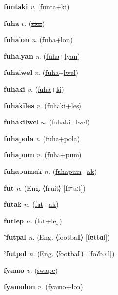 \textbf{\hypertarget{funtaki}{funtaki}} \textit{v.} (\hyperlink{funta}{funta}+\allowbreak \hyperlink{ki}{ki})


\textbf{\hypertarget{fuha}{fuha}} \textit{v.} (\hyperlink{sica}{\sout{sica}})


\textbf{\hypertarget{fuhalon}{fuhalon}} \textit{n.} (\hyperlink{fuha}{fuha}+\allowbreak \hyperlink{lon}{lon})


\textbf{\hypertarget{fuhalyan}{fuhalyan}} \textit{n.} (\hyperlink{fuha}{fuha}+\allowbreak \hyperlink{lyan}{lyan})


\textbf{\hypertarget{fuhalwel}{fuhalwel}} \textit{n.} (\hyperlink{fuha}{fuha}+\allowbreak \hyperlink{lwel}{lwel})


\textbf{\hypertarget{fuhaki}{fuhaki}} \textit{v.} (\hyperlink{fuha}{fuha}+\allowbreak \hyperlink{ki}{ki})


\textbf{\hypertarget{fuhakiles}{fuhakiles}} \textit{n.} (\hyperlink{fuhaki}{fuhaki}+\allowbreak \hyperlink{les}{les})


\textbf{\hypertarget{fuhakilwel}{fuhakilwel}} \textit{n.} (\hyperlink{fuhaki}{fuhaki}+\allowbreak \hyperlink{lwel}{lwel})


\textbf{\hypertarget{fuhapola}{fuhapola}} \textit{v.} (\hyperlink{fuha}{fuha}+\allowbreak \hyperlink{pola}{pola})


\textbf{\hypertarget{fuhapum}{fuhapum}} \textit{n.} (\hyperlink{fuha}{fuha}+\allowbreak \hyperlink{pum}{pum})


\textbf{\hypertarget{fuhapumak}{fuhapumak}} \textit{n.} (\hyperlink{fuhapum}{fuhapum}+\allowbreak \hyperlink{ak}{ak})


\textbf{\hypertarget{fut}{fut}} \textit{n.} (Eng. ⟨fruit⟩ [fɹʷuːt])


\textbf{\hypertarget{futak}{futak}} \textit{n.} (\hyperlink{fut}{fut}+\allowbreak \hyperlink{ak}{ak})


\textbf{\hypertarget{futlep}{futlep}} \textit{n.} (\hyperlink{fut}{fut}+\allowbreak \hyperlink{lep}{lep})


\textbf{\hypertarget{'futpal}{'futpal}} \textit{n.} (Eng. ⟨football⟩ [fʊtbɑl])


\textbf{\hypertarget{'futpol}{'futpol}} \textit{n.} (Eng. ⟨football⟩ [ˈfʊʔbɔːl])


\textbf{\hypertarget{fyamo}{fyamo}} \textit{v.} (\hyperlink{swape}{\sout{swape}})


\textbf{\hypertarget{fyamolon}{fyamolon}} \textit{n.} (\hyperlink{fyamo}{fyamo}+\allowbreak \hyperlink{lon}{lon})



